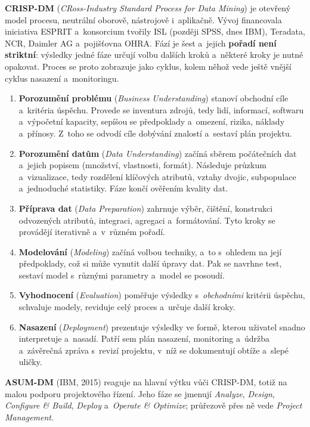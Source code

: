 \documentclass[11pt,a4paper]{article}
\theoremstyle{definition}
\begin{document}
\textbf{CRISP-DM} (\emph{CRoss-Industry Standard Process for Data Mining}) je otevřený
model procesu, neutrální oborově, nástrojově i~aplikačně. Vývoj financovala iniciativa
ESPRIT a~konsorcium tvořily ISL (později SPSS, dnes IBM), Teradata, NCR, Daimler AG
a~pojišťovna OHRA. Fází je šest a~jejich \textbf{pořadí není striktní}: výsledky jedné
fáze určují volbu dalších kroků a~některé kroky je nutné opakovat. Proces se proto
zobrazuje jako cyklus, kolem něhož vede ještě vnější cyklus nasazení a~monitoringu.

\begin{enumerate}
\item \textbf{Porozumění problému} (\emph{Business Understanding}) stanoví obchodní cíle
      a~kritéria úspěchu. Provede se inventura zdrojů, tedy lidí, informací, softwaru
      a~výpočetní kapacity, sepíšou se předpoklady a~omezení, rizika, náklady a~přínosy.
      Z~toho se odvodí cíle dobývání znalostí a~sestaví plán projektu.
\item \textbf{Porozumění datům} (\emph{Data Understanding}) začíná sběrem počátečních dat
      a~jejich popisem (množství, vlastnosti, formát). Následuje průzkum a~vizualizace,
      tedy rozdělení klíčových atributů, vztahy dvojic, subpopulace a~jednoduché
      statistiky. Fáze končí ověřením kvality dat.
\item \textbf{Příprava dat} (\emph{Data Preparation}) zahrnuje výběr, čištění, konstrukci
      odvozených atributů, integraci, agregaci a~formátování. Tyto kroky se provádějí
      iterativně a~v~různém pořadí.
\item \textbf{Modelování} (\emph{Modeling}) začíná volbou techniky, a~to s~ohledem na její
      předpoklady, což si může vynutit další úpravy dat. Pak se navrhne test, sestaví
      model s~různými parametry a~model se posoudí.
\item \textbf{Vyhodnocení} (\emph{Evaluation}) poměřuje výsledky s~\emph{obchodními}
      kritérii úspěchu, schvaluje modely, reviduje celý proces a~určuje další kroky.
\item \textbf{Nasazení} (\emph{Deployment}) prezentuje výsledky ve formě, kterou uživatel
      snadno interpretuje a~nasadí. Patří sem plán nasazení, monitoring a~údržba
      a~závěrečná zpráva s~revizí projektu, v~níž se dokumentují obtíže a~slepé uličky.
\end{enumerate}

\textbf{ASUM-DM} (IBM, 2015) reaguje na hlavní výtku vůči CRISP-DM, totiž na malou podporu
projektového řízení. Jeho fáze se jmenují \emph{Analyze}, \emph{Design}, \emph{Configure
\& Build}, \emph{Deploy} a~\emph{Operate \& Optimize}; průřezově přes ně vede
\emph{Project Management}.
\end{document}
